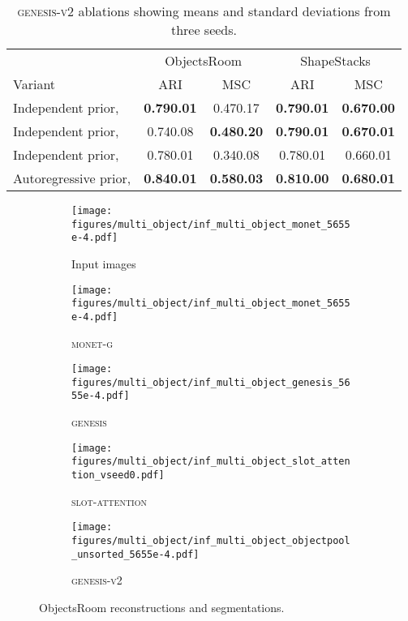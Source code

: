 \documentclass{article}
\begin{document}
\begin{table}[h!]
	\centering
	\caption{\textsc{genesis-v2} ablations showing means and standard deviations from three seeds.}
    
	\begin{tabular}{l cccc}
		\toprule
		& \multicolumn{2}{c}{ObjectsRoom} & \multicolumn{2}{c}{ShapeStacks} \\
		\cmidrule(lr){2-3} \cmidrule(lr){4-5}
		Variant & ARI & MSC & ARI & MSC \\
		\midrule
		Independent prior,      & \textbf{0.790.01}         & 0.470.17           & \textbf{0.790.01}        & \textbf{0.670.00} \\
		Independent prior,      & 0.740.08           & \textbf{0.480.20}         & \textbf{0.790.01}        & \textbf{0.670.01} \\
		Independent prior,      & 0.780.01           & 0.340.08           & 0.780.01          & 0.660.01\\
		\midrule
		Autoregressive prior,  & \textbf{0.840.01}  & \textbf{0.580.03}  & \textbf{0.810.00} &
		\textbf{0.680.01}\\
		\bottomrule
	\end{tabular}
	\label{tab:gpp:ablations}
\end{table}

\begin{figure}[h!]
	\centering
	\begin{subfigure}{\linewidth}
		\texttt{[image: figures/multi\_object/inf\_multi\_object\_monet\_5655e-4.pdf]}
		\caption{Input images}
		\vspace{6pt}
	\end{subfigure}
	\begin{subfigure}{\linewidth}
		\texttt{[image: figures/multi\_object/inf\_multi\_object\_monet\_5655e-4.pdf]}
		\caption{\textsc{monet-g}}
		\vspace{6pt}
	\end{subfigure}
	\begin{subfigure}{\linewidth}
		\texttt{[image: figures/multi\_object/inf\_multi\_object\_genesis\_5655e-4.pdf]}
		\caption{\textsc{genesis}}
		\vspace{6pt}
	\end{subfigure}
	\begin{subfigure}{\linewidth}
		\texttt{[image: figures/multi\_object/inf\_multi\_object\_slot\_attention\_vseed0.pdf]}
		\caption{\textsc{slot-attention}}
		\vspace{6pt}
	\end{subfigure}
	\begin{subfigure}{\linewidth}
		\texttt{[image: figures/multi\_object/inf\_multi\_object\_objectpool\_unsorted\_5655e-4.pdf]}
		\caption{\textsc{genesis-v2}}
	\end{subfigure}
	\caption{ObjectsRoom reconstructions and segmentations.}
\end{figure}
\end{document}
